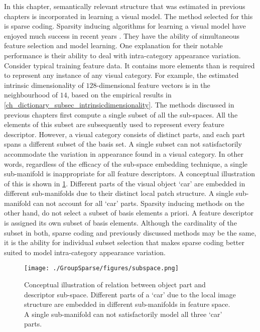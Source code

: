 In this chapter, semantically relevant structure that was estimated in previous chapters is incorporated in learning a visual model. The method selected for this is sparse coding. Sparsity inducing algorithms for learning a visual model have enjoyed much success in recent years \citep{Yang2009}. They have the ability of simultaneous feature selection and model learning. One explanation for their notable performance is their ability to deal with intra-category appearance variation. Consider typical training feature data. It contains more elements than is required to represent any instance of any visual category. For example, the estimated intrinsic dimensionality of $128$-dimensional feature vectors is in the neighbourhood of $14$, based on the empirical results in \cref{ch_dictionary_subsec_intrinsicdimensionality}. The methods discussed in previous chapters first compute a single subset of all the sub-spaces. All the elements of this subset are subsequently used to represent every feature descriptor. However, a visual category consists of distinct parts, and each part spans a different subset of the basis set. A single subset can not satisfactorily accommodate the variation in appearance found in a visual category. In other words, regardless of the efficacy of the sub-space embedding technique, a single sub-manifold is inappropriate for all feature descriptors. A conceptual illustration of this is shown in \cref{fig:objectpartsubspace}. Different parts of the visual object `car' are embedded in different sub-manifolds due to their distinct local patch structure. A single sub-manifold can not account for all `car' parts. Sparsity inducing methods on the other hand, do not select a subset of basis elements a priori. A feature descriptor is assigned its own subset of basis elements. Although the cardinality of the subset in both, sparse coding and previously discussed methods may be the same, it is the ability for individual subset selection that makes sparse coding better suited to model intra-category 
appearance variation.

\begin{figure}
 \centering
 \texttt{[image: ./GroupSparse/figures/subspace.png]}
 \caption[Conceptual illustration of relation between object part and descriptor sub-space]{Conceptual illustration of relation between object part and descriptor sub-space. Different parts of a `car' due to the local image structure are embedded in different sub-manifolds in feature space. A single sub-manifold can not satisfactorily model all three `car' parts.}
 \label{fig:objectpartsubspace}
\end{figure}

